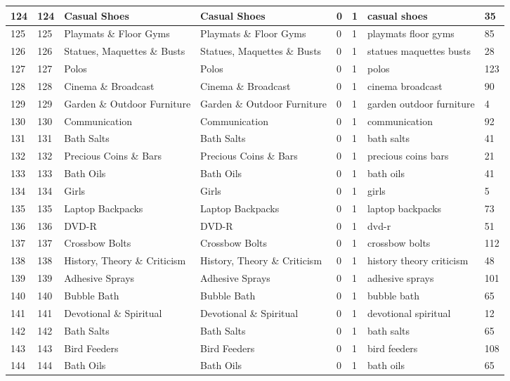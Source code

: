 \begin{longtable}{|l|l|l|l|l|l|l|l|}
124 & 124 & Casual Shoes & Casual Shoes & 0 & 1 & casual shoes & 35 \\ \hline 
125 & 125 & Playmats \& Floor Gyms & Playmats \& Floor Gyms & 0 & 1 & playmats floor gyms & 85 \\ \hline 
126 & 126 & Statues, Maquettes \& Busts & Statues, Maquettes \& Busts & 0 & 1 & statues maquettes busts & 28 \\ \hline 
127 & 127 & Polos & Polos & 0 & 1 & polos & 123 \\ \hline 
128 & 128 & Cinema \& Broadcast & Cinema \& Broadcast & 0 & 1 & cinema broadcast & 90 \\ \hline 
129 & 129 & Garden \& Outdoor Furniture & Garden \& Outdoor Furniture & 0 & 1 & garden outdoor furniture & 4 \\ \hline 
130 & 130 & Communication & Communication & 0 & 1 & communication & 92 \\ \hline 
131 & 131 & Bath Salts & Bath Salts & 0 & 1 & bath salts & 41 \\ \hline 
132 & 132 & Precious Coins \& Bars & Precious Coins \& Bars & 0 & 1 & precious coins bars & 21 \\ \hline 
133 & 133 & Bath Oils & Bath Oils & 0 & 1 & bath oils & 41 \\ \hline 
134 & 134 & Girls & Girls & 0 & 1 & girls & 5 \\ \hline 
135 & 135 & Laptop Backpacks & Laptop Backpacks & 0 & 1 & laptop backpacks & 73 \\ \hline 
136 & 136 & DVD-R & DVD-R & 0 & 1 & dvd-r & 51 \\ \hline 
137 & 137 & Crossbow Bolts & Crossbow Bolts & 0 & 1 & crossbow bolts & 112 \\ \hline 
138 & 138 & History, Theory \& Criticism & History, Theory \& Criticism & 0 & 1 & history theory criticism & 48 \\ \hline 
139 & 139 & Adhesive Sprays & Adhesive Sprays & 0 & 1 & adhesive sprays & 101 \\ \hline 
140 & 140 & Bubble Bath & Bubble Bath & 0 & 1 & bubble bath & 65 \\ \hline 
141 & 141 & Devotional \& Spiritual & Devotional \& Spiritual & 0 & 1 & devotional spiritual & 12 \\ \hline 
142 & 142 & Bath Salts & Bath Salts & 0 & 1 & bath salts & 65 \\ \hline 
143 & 143 & Bird Feeders & Bird Feeders & 0 & 1 & bird feeders & 108 \\ \hline 
144 & 144 & Bath Oils & Bath Oils & 0 & 1 & bath oils & 65 \\ \hline 

\end{longtable}
